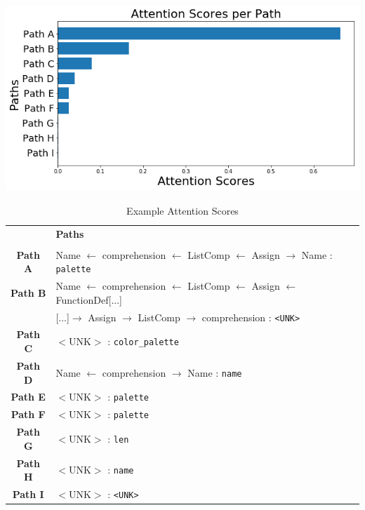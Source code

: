 \begingroup
\begin{table}
\begin{center}
\includegraphics[width=0.8\linewidth]{ImagesCodeRelated/attention_xkcd.png}
    \fontsize{10pt}{12pt}\selectfont
\begin{tabular}{c l}
    & \textbf{Paths} \\
    \\
    \textbf{Path A} & Name $\leftarrow$ comprehension $\leftarrow$ ListComp $\leftarrow$ Assign $\rightarrow$ Name : \texttt{palette} \\
    \textbf{Path B} & Name $\leftarrow$ comprehension $\leftarrow$ ListComp $\leftarrow$ Assign $\leftarrow$ FunctionDef[...] \\
        & [...]$\rightarrow$ Assign $\rightarrow$ ListComp $\rightarrow$ comprehension : \texttt{<UNK>} \\
    \textbf{Path C} & $<$UNK$>$ : \texttt{color_palette} \\
    \textbf{Path D} & Name $\leftarrow$ comprehension $\rightarrow$ Name : \texttt{name} \\
    \textbf{Path E} & $<$UNK$>$ : \texttt{palette} \\
    \textbf{Path F} & $<$UNK$>$ : \texttt{palette} \\
    \textbf{Path G} & $<$UNK$>$ : \texttt{len} \\
    \textbf{Path H} & $<$UNK$>$ : \texttt{name} \\
    \textbf{Path I} & $<$UNK$>$ : \texttt{<UNK>} \\
\end{tabular}
\end{center}

\caption{Example Attention Scores}
\end{table}
\endgroup

